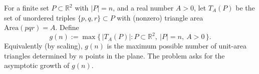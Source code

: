 For a finite set \(P\subset\mathbb{R}^2\) with \(|P|=n\), and a real number \(A>0\), let
\(T_A(P)\) be the set of unordered triples \(\{p,q,r\}\subset P\) with (nonzero) triangle area \(\mathrm{Area}(pqr)=A\).
Define
\[
 g(n):=\max\{\,|T_A(P)|: P\subset\mathbb{R}^2,\ |P|=n,\ A>0\,\}.
\]
Equivalently (by scaling), \(g(n)\) is the maximum possible number of unit-area triangles determined by \(n\) points in the plane.
The problem asks for the asymptotic growth of \(g(n)\).
